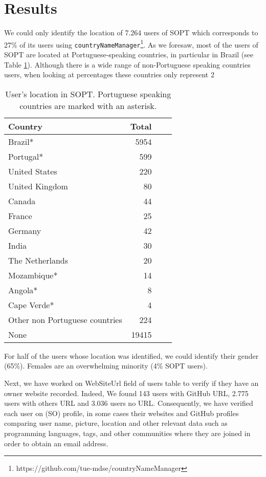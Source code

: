 \section{Results}
We could only identify the location of 7.264 users of SOPT which corresponds to 27\% of its users using \texttt{countryNameManager}\footnote{https://github.com/tue-mdse/countryNameManager}. As we foresaw, most of the users of SOPT are located at Portuguese-speaking countries, in particular in Brazil (see Table \ref{tbl:Locations}). Although there is a wide range of non-Portuguese speaking countries users, when looking at percentages these countries only represent 2%

\begin{table}[ht]
\begin{center}
\scriptsize{
\begin{tabular}{lrrr}
Country & Total \\
\hline
Brazil* 			& 5954 \\
Portugal* 			& 599 \\
United States 		& 220 \\
United Kingdom      & 80 \\
Canada				& 44 \\
France              & 25 \\
Germany				& 42 \\
India				& 30 \\
The Netherlands		& 20 \\
Mozambique*		    & 14 \\
Angola*		 		& 8 \\
Cape Verde*		    & 4 \\
Other non Portuguese countries		 & 224 \\
None 				& 19415 \\
\end{tabular}
\caption{User's location in SOPT. Portuguese speaking countries are marked with an asterisk.}
\label{tbl:Locations}
}
\end{center}
\end{table}

For half of the users whose location was identified, we could identify their gender (65\%). Females are an overwhelming minority (4\% SOPT users).



Next, we have worked on WebSiteUrl field of users table to verify if they have an owner website recorded. Indeed, We found 143 users with GitHub URL, 2.775 users with others URL and 3.036 users no URL. Consequently, we have verified  each user on (SO) profile, in some cases their websites and GitHub profiles comparing user name, picture, location and other relevant data such as programming languages, tags, and other communities where they are joined in order to obtain an email address. 